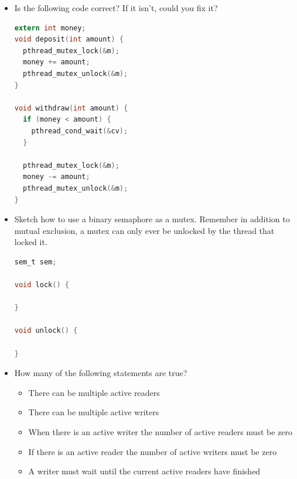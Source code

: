 \begin{itemize}
\begin{lstlisting}[language=C]
    pthread_mutex_init(&mutex, NULL);
    pthread_cond_init(&cond, NULL);

    pthread_cond_broadcast(&cond);
    pthread_cond_wait(&cond,&mutex);

    return 0;
}
\end{lstlisting}
\item
  Is the following code correct? If it isn't, could you fix it?
\begin{lstlisting}[language=C]
extern int money;
void deposit(int amount) {
  pthread_mutex_lock(&m);
  money += amount;
  pthread_mutex_unlock(&m);
}

void withdraw(int amount) {
  if (money < amount) {
    pthread_cond_wait(&cv);
  }

  pthread_mutex_lock(&m);
  money -= amount;
  pthread_mutex_unlock(&m);
}
\end{lstlisting}
\item
  Sketch how to use a binary semaphore as a mutex. Remember in addition to mutual exclusion, a mutex can only ever be unlocked by the thread that locked it.
\begin{lstlisting}[language=C]
sem_t sem;

void lock() {

}

void unlock() {

}
\end{lstlisting}
\item
  How many of the following statements are true?

        \begin{itemize}
        \item
        There can be multiple active readers
        \item
        There can be multiple active writers
        \item
        When there is an active writer the number of active readers must be zero
        \item
        If there is an active reader the number of active writers must be zero
        \item
        A writer must wait until the current active readers have finished
        \end{itemize}
\end{itemize}



